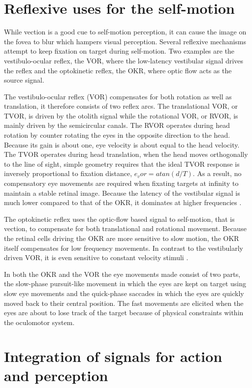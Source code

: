 \section{Reflexive uses for the self-motion}
While vection is a good cue to self-motion perception, it can cause the image on the fovea to blur which hampers visual perception. Several reflexive mechanisms attempt to keep fixation on target during self-motion. Two examples are the vestibulo-ocular reflex, the VOR, where the low-latency vestibular signal drives the reflex and the optokinetic reflex, the OKR, where optic flow acts as the source signal.

The vestibulo-ocular reflex (VOR) compensates for both rotation as well as translation, it therefore consists of two reflex arcs. The translational VOR, or TVOR, is driven by the otolith signal while the rotational VOR, or RVOR, is mainly driven by the semicircular canals. The RVOR operates during head rotation by counter rotating the eyes in the opposite direction to the head. Because its gain is about one, eye velocity is about equal to the head velocity. The TVOR operates during head translation, when the head moves orthogonally to the line of sight, simple geometry requires that the ideal TVOR response is inversely proportional to fixation distance, $e_vor = atan⁡(d/T)$. As a result, no compensatory eye movements are required when fixating targets at infinity to maintain a stable retinal image. Because the latency of the vestibular signal is much lower compared to that of the OKR, it dominates at higher frequencies \cite{schweigard1997}.

The optokinetic reflex uses the optic-flow based signal to self-motion, that is vection, to compensate for both translational and rotational movement. Because the retinal cells driving the OKR are more sensitive to slow motion, the OKR itself compensates for low frequency movements. In contrast to the vestibularly driven VOR, it is even sensitive to constant velocity stimuli \cite{soodak1988}.

In both the OKR and the VOR the eye movements made consist of two parts, the slow-phase pursuit-like movement in which the eyes are kept on target using slow eye movements and the quick-phase saccades in which the eyes are quickly moved back to their central position. The fast movements are elicited when the eyes are about to lose track of the target because of physical constraints within the oculomotor system.



\section{Integration of signals for action and perception}

